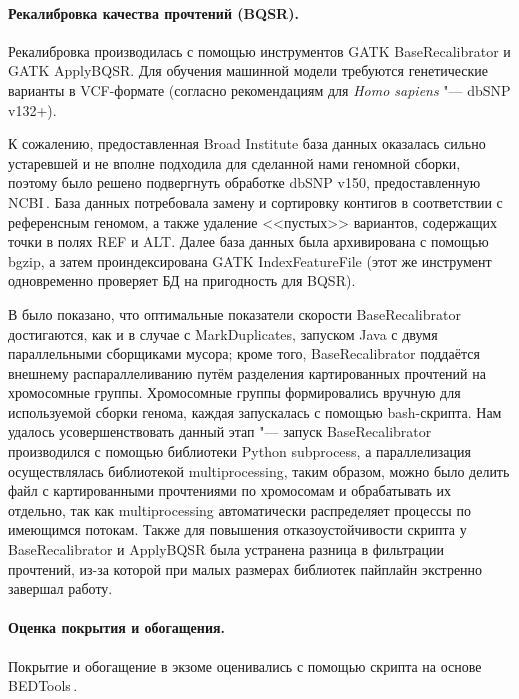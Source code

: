 \documentclass[a4paper,14pt]{extarticle}
\newcommand{\utilname}[1]{\textenglish{#1}}
\newcommand{\ecitep}[1]{\textenglish{\citep{#1}}}
\begin{document}
\paragraph{Рекалибровка качества прочтений (BQSR).}
Рекалибровка производилась с помощью инструментов \utilname{GATK BaseRecalibrator} и \utilname{GATK ApplyBQSR}.
Для обучения машинной модели требуются генетические варианты в VCF-формате (согласно рекомендациям для \textit{Homo sapiens} "--- dbSNP v132+).

К сожалению, предоставленная Broad Institute база данных оказалась сильно устаревшей и не вполне подходила для сделанной нами геномной сборки, поэтому было решено подвергнуть обработке dbSNP v150, предоставленную NCBI\,\ecitep{Sherry_2001}.
База данных потребовала замену и сортировку контигов в соответствии с референсным геномом, а также удаление <<пустых>> вариантов, содержащих точки в полях REF и ALT.
Далее база данных была архивирована с помощью \utilname{bgzip}, а затем проиндексирована \utilname{GATK IndexFeatureFile} (этот же инструмент одновременно проверяет БД на пригодность для BQSR).

В \citet{Heldenbrand_2019} было показано, что оптимальные показатели скорости \utilname{BaseRecalibrator} достигаются, как и в случае с \utilname{MarkDuplicates}, запуском \utilname{Java} с двумя параллельными сборщиками мусора;
кроме того, \utilname{BaseRecalibrator} поддаётся внешнему распараллеливанию путём разделения картированных прочтений на хромосомные группы.
Хромосомные группы формировались вручную для используемой сборки генома, каждая запускалась с помощью \utilname{bash}-скрипта.
Нам удалось усовершенствовать данный этап "--- запуск \utilname{BaseRecalibrator} производился с помощью библиотеки \utilname{Python} \utilname{subprocess}, а параллелизация осуществлялась библиотекой \utilname{multiprocessing}, таким образом, можно было делить файл с картированными прочтениями по хромосомам и обрабатывать их отдельно, так как \utilname{multiprocessing} автоматически распределяет процессы по имеющимся потокам.
Также для повышения отказоустойчивости скрипта у \utilname{BaseRecalibrator} и \utilname{ApplyBQSR} была устранена разница в фильтрации прочтений, из-за которой при малых размерах библиотек пайплайн экстренно завершал работу.

\paragraph{Оценка покрытия и обогащения.}
Покрытие и обогащение в экзоме оценивались с помощью скрипта на основе \utilname{BEDTools}\,\ecitep{Quinlan_2010}.
\end{document}
